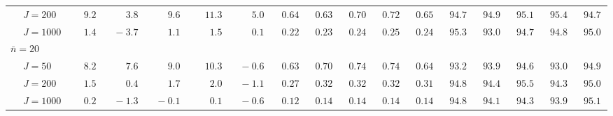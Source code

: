 \begin{sidewaystable}
\begin{threeparttable}
\begin{tabular}{llccccccccccccccc}
 & \nopagebreak $\;J=200$  & $\phantom{0}\phantom{-}9.2\phantom{0}$ & $\phantom{0}\phantom{-}3.8\phantom{0}$ & $\phantom{0}\phantom{-}9.6\phantom{0}$ & $\phantom{-}11.3\phantom{0}$ & $\phantom{0}\phantom{-}5.0\phantom{0}$ & $\phantom{0}0.64\phantom{0}$ & $\phantom{0}0.63\phantom{0}$ & $\phantom{0}0.70\phantom{0}$ & $\phantom{0}0.72\phantom{0}$ & $\phantom{0}0.65\phantom{0}$ & $\phantom{0}94.7\phantom{0}$ & $\phantom{0}94.9\phantom{0}$ & $\phantom{0}95.1\phantom{0}$ & $\phantom{0}95.4\phantom{0}$ & $\phantom{0}94.7\phantom{0}$ \\
 & \nopagebreak $\;J=1000$  & $\phantom{0}\phantom{-}1.4\phantom{0}$ & $\phantom{0}{-}3.7\phantom{0}$ & $\phantom{0}\phantom{-}1.1\phantom{0}$ & $\phantom{0}\phantom{-}1.5\phantom{0}$ & $\phantom{0}\phantom{-}0.1\phantom{0}$ & $\phantom{0}0.22\phantom{0}$ & $\phantom{0}0.23\phantom{0}$ & $\phantom{0}0.24\phantom{0}$ & $\phantom{0}0.25\phantom{0}$ & $\phantom{0}0.24\phantom{0}$ & $\phantom{0}95.3\phantom{0}$ & $\phantom{0}93.0\phantom{0}$ & $\phantom{0}94.7\phantom{0}$ & $\phantom{0}94.8\phantom{0}$ & $\phantom{0}95.0\phantom{0}$ \\
\multicolumn{4}{l}{$\bar{n}=20$} \\  & \nopagebreak $\;J=50$  & $\phantom{0}\phantom{-}8.2\phantom{0}$ & $\phantom{0}\phantom{-}7.6\phantom{0}$ & $\phantom{0}\phantom{-}9.0\phantom{0}$ & $\phantom{-}10.3\phantom{0}$ & $\phantom{0}{-}0.6\phantom{0}$ & $\phantom{0}0.63\phantom{0}$ & $\phantom{0}0.70\phantom{0}$ & $\phantom{0}0.74\phantom{0}$ & $\phantom{0}0.74\phantom{0}$ & $\phantom{0}0.64\phantom{0}$ & $\phantom{0}93.2\phantom{0}$ & $\phantom{0}93.9\phantom{0}$ & $\phantom{0}94.6\phantom{0}$ & $\phantom{0}93.0\phantom{0}$ & $\phantom{0}94.9\phantom{0}$ \\
 & \nopagebreak $\;J=200$  & $\phantom{0}\phantom{-}1.5\phantom{0}$ & $\phantom{0}\phantom{-}0.4\phantom{0}$ & $\phantom{0}\phantom{-}1.7\phantom{0}$ & $\phantom{0}\phantom{-}2.0\phantom{0}$ & $\phantom{0}{-}1.1\phantom{0}$ & $\phantom{0}0.27\phantom{0}$ & $\phantom{0}0.32\phantom{0}$ & $\phantom{0}0.32\phantom{0}$ & $\phantom{0}0.32\phantom{0}$ & $\phantom{0}0.31\phantom{0}$ & $\phantom{0}94.8\phantom{0}$ & $\phantom{0}94.4\phantom{0}$ & $\phantom{0}95.5\phantom{0}$ & $\phantom{0}94.3\phantom{0}$ & $\phantom{0}95.0\phantom{0}$ \\
 & \nopagebreak $\;J=1000$  & $\phantom{0}\phantom{-}0.2\phantom{0}$ & $\phantom{0}{-}1.3\phantom{0}$ & $\phantom{0}{-}0.1\phantom{0}$ & $\phantom{0}\phantom{-}0.1\phantom{0}$ & $\phantom{0}{-}0.6\phantom{0}$ & $\phantom{0}0.12\phantom{0}$ & $\phantom{0}0.14\phantom{0}$ & $\phantom{0}0.14\phantom{0}$ & $\phantom{0}0.14\phantom{0}$ & $\phantom{0}0.14\phantom{0}$ & $\phantom{0}94.8\phantom{0}$ & $\phantom{0}94.1\phantom{0}$ & $\phantom{0}94.3\phantom{0}$ & $\phantom{0}93.9\phantom{0}$ & $\phantom{0}95.1\phantom{0}$ \\

\end{tabular}
\end{threeparttable}
\end{sidewaystable}
